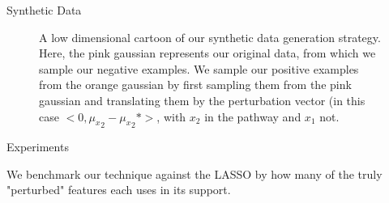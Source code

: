 \documentclass[svgnames,final]{beamer}
\begin{document}
\begin{frame}
\begin{columns}[T]
\begin{column}{.3\linewidth}
\begin{block}{Synthetic Data}
\begin{figure}[h]
		\caption{A low dimensional cartoon of our synthetic data generation strategy.
				Here, the pink gaussian represents our original data, from which we sample our negative examples.
				We sample our positive examples from the orange gaussian by first sampling them from the pink gaussian
				and translating them by the perturbation vector
				(in this case $<0, {\mu_x}_2 - {\mu_x}_2 *>$, with $x_2$ in the pathway and $x_1$ not.}
		\end{figure}





	\end{block}


	\begin{block}{Experiments}

		We benchmark our technique against the LASSO by how many of the truly "perturbed" features each uses in its support.


\end{block}
\end{column}
\end{columns}
\end{frame}
\end{document}
